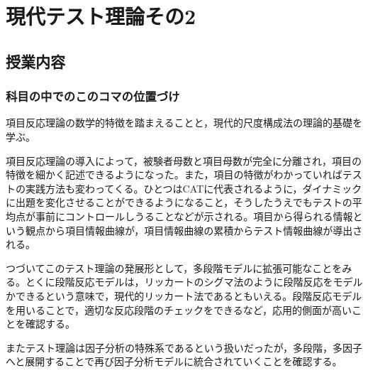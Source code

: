 \section{現代テスト理論その2}
\subsection{授業内容}
\subsubsection{科目の中でのこのコマの位置づけ}
項目反応理論の数学的特徴を踏まえることと，現代的尺度構成法の理論的基礎を学ぶ。

項目反応理論の導入によって，被験者母数と項目母数が完全に分離され，項目の特徴を細かく記述できるようになった。また，項目の特徴がわかっていればテストの実践方法も変わってくる。ひとつはCATに代表されるように，ダイナミックに出題を変化させることができるようになること，そうしたうえでもテストの平均点が事前にコントロールしうることなどが示される。項目から得られる情報という観点から項目情報曲線が，項目情報曲線の累積からテスト情報曲線が導出される。

つづいてこのテスト理論の発展形として，多段階モデルに拡張可能なことをみる。とくに段階反応モデルは，リッカートのシグマ法のように段階反応をモデルかできるという意味で，現代的リッカート法であるともいえる。段階反応モデルを用いることで，適切な反応段階のチェックをできるなど，応用的側面が高いことを確認する。

またテスト理論は因子分析の特殊系であるという扱いだったが，多段階，多因子へと展開することで再び因子分析モデルに統合されていくことを確認する。

